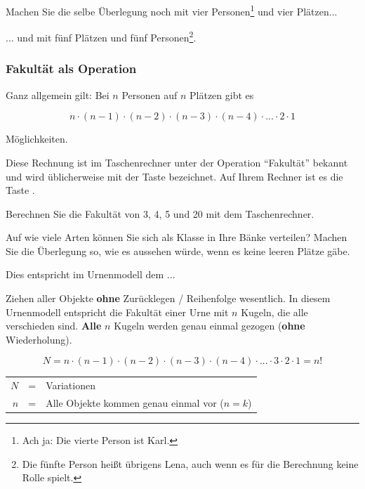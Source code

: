 Machen Sie die selbe Überlegung noch mit vier Personen\footnote{Ach ja: Die vierte Person ist Karl.} und vier
Plätzen...


... und mit fünf Plätzen und fünf Personen\footnote{Die fünfte Person heißt übrigens Lena, auch wenn es für die Berechnung keine Rolle spielt.}.

\newpage


\subsubsection{Fakultät als Operation}

Ganz allgemein gilt: Bei $n$ Personen auf $n$ Plätzen gibt es

$$n\cdot{} (n-1) \cdot{} (n-2) \cdot{} (n-3) \cdot{} (n-4) \cdot{}
... \cdot{} 2 \cdot{} 1$$

Möglichkeiten.

Diese Rechnung ist im Taschenrechner unter der Operation ``Fakultät''
bekannt und wird üblicherweise mit der Taste  bezeichnet. Auf
Ihrem Rechner ist es die Taste .

Berechnen Sie die Fakultät von 3, 4, 5 und 20 mit dem Taschenrechner.


Auf wie viele Arten können Sie sich als Klasse in Ihre Bänke
verteilen? Machen Sie die Überlegung so, wie es aussehen würde, wenn es keine leeren Plätze gäbe.


Dies entspricht im Urnenmodell dem ...
\begin{gesetz}{Ziehen aller Objekte \textbf{ohne} Zurücklegen / Reihenfolge wesentlich.}{}
In diesem Urnenmodell entspricht die Fakultät einer Urne mit $n$ Kugeln, die
alle verschieden sind. \textbf{Alle} $n$ Kugeln werden genau einmal
gezogen (\textbf{ohne} Wiederholung).

$$N = n\cdot{} (n-1) \cdot{} (n-2) \cdot{} (n-3) \cdot{}
(n-4) \cdot{} ... \cdot{} 3\cdot{} 2 \cdot{} 1 = n!$$

\begin{tabular}{rcl}
  $N$ &=& Variationen\\
  $n$ &=& Alle Objekte kommen genau einmal vor ($n=k$) 
\end{tabular}

\end{gesetz}
\newpage


